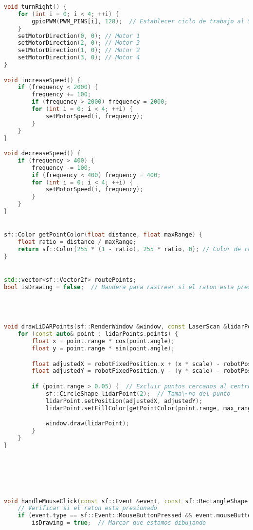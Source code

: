 \begin{lstlisting}[language={C++}, caption={Primer ajuste de c\'odigo}, label={Script}]
void turnRight() {
    for (int i = 0; i < 4; ++i) {
        gpioPWM(PWM_PINS[i], 128);  // Establecer ciclo de trabajo al 50%
    }
    setMotorDirection(0, 0); // Motor 1
    setMotorDirection(2, 0); // Motor 3
    setMotorDirection(1, 0); // Motor 2
    setMotorDirection(3, 0); // Motor 4
}

void increaseSpeed() {
    if (frequency < 2000) {
        frequency += 100;
        if (frequency > 2000) frequency = 2000;
        for (int i = 0; i < 4; ++i) {
            setMotorSpeed(i, frequency);
        }
    }
}

void decreaseSpeed() {
    if (frequency > 400) {
        frequency -= 100;
        if (frequency < 400) frequency = 400;
        for (int i = 0; i < 4; ++i) {
            setMotorSpeed(i, frequency);
        }
    }
}


sf::Color getPointColor(float distance, float maxRange) {
    float ratio = distance / maxRange;
    return sf::Color(255 * (1 - ratio), 255 * ratio, 0); // Color de rojo a verde
}


std::vector<sf::Vector2f> routePoints;
bool isDrawing = false;  // Bandera para rastrear si el raton esta presionado




void drawLiDARPoints(sf::RenderWindow &window, const LaserScan &lidarPoints, const sf::Vector2f &robotPosition, float scale, float max_range) {
    for (const auto& point : lidarPoints.points) {
        float x = point.range * cos(point.angle);
        float y = point.range * sin(point.angle);

        float adjustedX = robotFixedPosition.x + (x * scale) - robotPosition.x;
        float adjustedY = robotFixedPosition.y - (y * scale) - robotPosition.y;  // Invertir Y para la pantalla

        if (point.range > 0.05) {  // Excluir puntos cercanos al centro
            sf::CircleShape lidarPoint(2);  // Tama\~no del punto
            lidarPoint.setPosition(adjustedX, adjustedY);
            lidarPoint.setFillColor(getPointColor(point.range, max_range));  // Color basado en la distancia

            window.draw(lidarPoint);
        }
    }
}






void handleMouseClick(const sf::Event &event, const sf::RectangleShape &minimap) {
    // Verificar si el raton esta presionado
    if (event.type == sf::Event::MouseButtonPressed && event.mouseButton.button == sf::Mouse::Left) {
        isDrawing = true;  // Marcar que estamos dibujando


\end{lstlisting}
